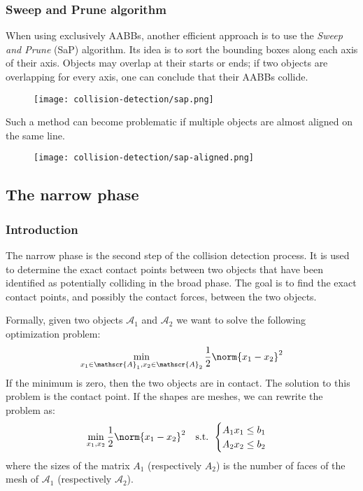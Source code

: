 \subsubsection{Sweep and Prune algorithm}
When using exclusively AABBs, another efficient approach is to use the \emph{Sweep and Prune} (SaP) algorithm. Its idea is to sort the bounding boxes along each axis of their axis. Objects may overlap at their starts or ends; if two objects are overlapping for every axis, one can conclude that their AABBs collide.
\begin{figure}[H]
    \centering
    \texttt{[image: collision-detection/sap.png]}
\end{figure}
Such a method can become problematic if multiple objects are almost aligned on the same line.
\begin{figure}[H]
    \centering
    \texttt{[image: collision-detection/sap-aligned.png]}
\end{figure}

\subsection{The narrow phase}
\subsubsection{Introduction}
The narrow phase is the second step of the collision detection process. It is used to determine the exact contact points between two objects that have been identified as potentially colliding in the broad phase. The goal is to find the exact contact points, and possibly the contact forces, between the two objects.

Formally, given two objects $\mathscr{A}_1$ and $\mathscr{A}_2$ we want to solve the following optimization problem:
\begin{equation*}
    \min_{x_1\in\mathscr{A}_1, x_2\in\mathscr{A}_2} \frac{1}{2}\norm{x_1-x_2}^2
\end{equation*}
If the minimum is zero, then the two objects are in contact. The solution to this problem is the contact point. If the shapes are meshes, we can rewrite the problem as:
\begin{equation*}
    \min_{x_1, x_2} \frac{1}{2}\norm{x_1-x_2}^2 \quad \text{s.t. } \begin{cases}
        A_1x_1\leq b_1\\
        A_2x_2\leq b_2
    \end{cases}
\end{equation*}
where the sizes of the matrix $A_1$ (respectively $A_2$) is the number of faces of the mesh of $\mathscr{A}_1$ (respectively $\mathscr{A}_2$).


